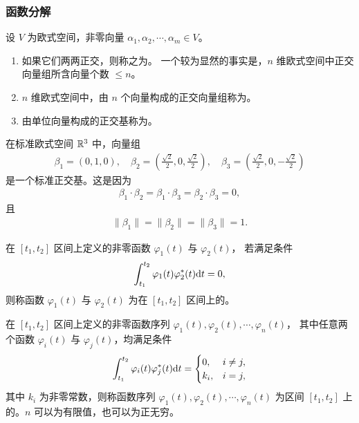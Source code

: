 \subsubsection{函数分解}

\begin{definition}[正交基]
    设 $V$ 为欧式空间，非零向量 $\alpha_1, \alpha_2, \cdots, \alpha_m \in V$。
    \begin{enumerate}
        \item 如果它们两两正交，则称之为。
            一个较为显然的事实是，$n$ 维欧式空间中正交向量组所含向量个数 $\le n$。
        \item $n$ 维欧式空间中，由 $n$ 个向量构成的正交向量组称为。
        \item 由单位向量构成的正交基称为。
    \end{enumerate}
\end{definition}

\begin{example}
    在标准欧式空间 $\mathbb{R}^3$ 中，向量组
    \begin{align*}
        \beta_1 = (0, 1, 0),
        \quad \beta_2 = (\frac{\sqrt{2}}{2}, 0, \frac{\sqrt{2}}{2}),
        \quad \beta_3 = (\frac{\sqrt{2}}{2}, 0, -\frac{\sqrt{2}}{2})
    \end{align*}
    是一个标准正交基。这是因为
    \begin{align*}
        \beta_1 \cdot \beta_2 = \beta_1 \cdot \beta_3 = \beta_2 \cdot \beta_3 = 0,
    \end{align*}
    且
    \begin{align*}
        \|\beta_1\| = \|\beta_2\| = \|\beta_3\| = 1.
    \end{align*}
\end{example}

\begin{definition}[正交函数与正交函数集]
    在 $[t_1, t_2]$ 区间上定义的非零函数 $\varphi_1(t)$ 与 $\varphi_2(t)$，
    若满足条件
    \begin{align*}
        \int_{t_1}^{t_2}\varphi_1(t)\varphi_2^*(t)\mathrm{d}{t} = 0,
    \end{align*}
    则称函数 $\varphi_1(t)$ 与 $\varphi_2(t)$ 为在 $[t_1, t_2]$ 区间上的。

    在 $[t_1, t_2]$ 区间上定义的非零函数序列 $\varphi_1(t), \varphi_2(t), \cdots, \varphi_n(t)$，
    其中任意两个函数 $\varphi_i(t)$ 与 $\varphi_j(t)$，均满足条件
    \begin{align*}
        \int_{t_1}^{t_2}\varphi_i(t)\varphi_j^*(t)\mathrm{d}{t} = \begin{cases}
            0, & i \ne j, \\
            k_i, & i = j,
        \end{cases}
    \end{align*}
    其中 $k_i$ 为非零常数，则称函数序列 $\varphi_1(t), \varphi_2(t), \cdots, \varphi_n(t)$
    为区间 $[t_1, t_2]$ 上的。$n$ 可以为有限值，也可以为正无穷。
\end{definition}

